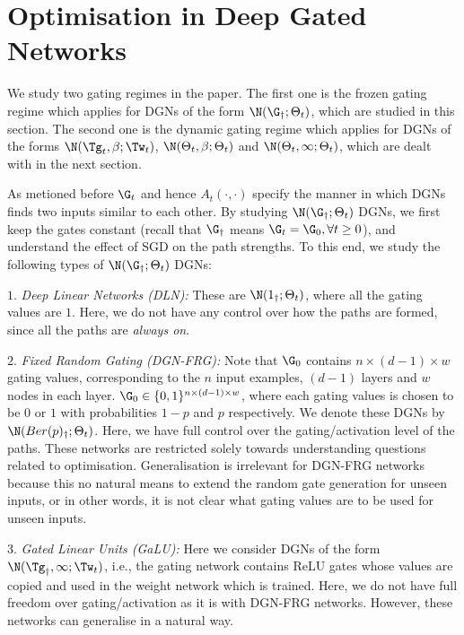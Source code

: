 \section{Optimisation in Deep Gated Networks}\label{sec:opt}
We study two gating regimes in the paper. The first one is the frozen gating regime which applies for DGNs of the form $\N(\G_{\dagger};\Theta_t)$, which are studied in this section. The second one is the dynamic gating regime which applies for DGNs of the forms $\N(\Tg_t,\beta;\Tw_t)$, $\N(\Theta_t,\beta;\Theta_t)$ and $\N(\Theta_t,\infty;\Theta_t)$, which are dealt with in the next section.

As metioned before $\G_t$ and hence $A_t(\cdot,\cdot)$ specify the manner in which DGNs finds two inputs similar to each other. By studying $\N(\G_{\dagger};\Theta_t)$  DGNs, we first keep the gates constant (recall that $\G_{\dagger}$ means $\G_t=\G_0,\forall t\geq 0$), and understand the effect of SGD on the path strengths. To this end, we study the following types of $\N(\G_{\dagger};\Theta_t)$ DGNs:


$1.$ \emph{Deep Linear Networks (DLN):} These are $\N(1_{\dagger}; \Theta_t)$, where all the gating values are $1$. Here, we do not have any control over how the paths are formed, since all the paths are \emph{always on}.

$2.$ \emph{Fixed Random Gating (DGN-FRG): } Note that $\G_0$ contains $n\times (d-1)\times w$ gating values, corresponding to the $n$ input examples, $(d-1)$ layers and $w$ nodes in each layer. $\G_0\in \{0,1\}^{n\times (d-1)\times w}$, where each gating values is chosen to be $0$ or $1$ with probabilities $1-p$ and $p$ respectively. We denote these DGNs by $\N(Ber(p)_{\dagger};\Theta_t)$. Here, we have full control over the gating/activation level of the paths. These networks are restricted solely towards understanding questions related to optimisation. Generalisation is irrelevant for DGN-FRG networks because this no natural means to extend the random gate generation for unseen inputs, or in other words, it is not clear what gating values are to be used for unseen inputs.

$3.$ \emph{Gated Linear Units (GaLU):} Here we consider DGNs of the form $\N(\Tg_{\dagger},\infty;\Tw_t)$, i.e., the gating network contains ReLU gates whose values are copied and used in the weight network which is trained. Here, we do not have full freedom over gating/activation as it is with DGN-FRG networks. However, these networks can generalise in a natural way.


